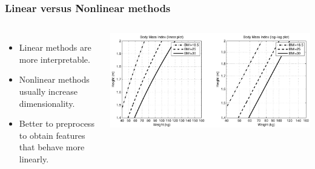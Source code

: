 \begin{frame}
\frametitle{Linear versus Nonlinear methods}
\begin{columns}[c]
\begin{itemize}
\item Linear methods are more interpretable.
\item Nonlinear methods usually increase dimensionality.
\item Better to preprocess to obtain features that behave more linearly.
\end{itemize}
\includegraphics[width=\textwidth]{bmi}

\end{columns}
\end{frame}
